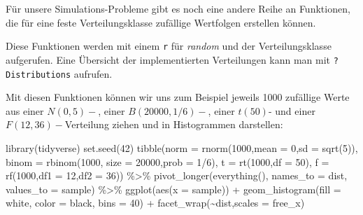 \documentclass[
]{book}
\newenvironment{Shaded}{\begin{snugshade}}{\end{snugshade}}
\newcommand{\AttributeTok}[1]{\textcolor[rgb]{0.77,0.63,0.00}{#1}}
\newcommand{\DecValTok}[1]{\textcolor[rgb]{0.00,0.00,0.81}{#1}}
\newcommand{\FunctionTok}[1]{\textcolor[rgb]{0.00,0.00,0.00}{#1}}
\newcommand{\NormalTok}[1]{#1}
\newcommand{\SpecialCharTok}[1]{\textcolor[rgb]{0.00,0.00,0.00}{#1}}
\newcommand{\StringTok}[1]{\textcolor[rgb]{0.31,0.60,0.02}{#1}}
\begin{document}
Für unsere Simulations-Probleme gibt es noch eine andere Reihe an Funktionen, die für eine feste Verteilungsklasse zufällige Wertfolgen erstellen können.

Diese Funktionen werden mit einem \texttt{r} für \emph{random} und der Verteilungsklasse aufgerufen. Eine Übersicht der implementierten Verteilungen kann man mit \texttt{?Distributions} aufrufen.

Mit diesen Funktionen können wir uns zum Beispiel jeweils 1000 zufällige Werte aus einer \(N(0,5)-\), einer \(B(20000, 1/6)-\), einer \(t(50)\)- und einer \(F(12,36)-\)Verteilung ziehen und in Histogrammen darstellen:

\begin{Shaded}
\begin{Highlighting}[]
\FunctionTok{library}\NormalTok{(tidyverse)}
\FunctionTok{set.seed}\NormalTok{(}\DecValTok{42}\NormalTok{)}
\FunctionTok{tibble}\NormalTok{(}\AttributeTok{norm =} \FunctionTok{rnorm}\NormalTok{(}\DecValTok{1000}\NormalTok{,}\AttributeTok{mean =} \DecValTok{0}\NormalTok{,}\AttributeTok{sd =} \FunctionTok{sqrt}\NormalTok{(}\DecValTok{5}\NormalTok{)),}
       \AttributeTok{binom =} \FunctionTok{rbinom}\NormalTok{(}\DecValTok{1000}\NormalTok{, }\AttributeTok{size =} \DecValTok{20000}\NormalTok{,}\AttributeTok{prob =} \DecValTok{1}\SpecialCharTok{/}\DecValTok{6}\NormalTok{),}
       \AttributeTok{t =} \FunctionTok{rt}\NormalTok{(}\DecValTok{1000}\NormalTok{,}\AttributeTok{df =} \DecValTok{50}\NormalTok{),}
       \AttributeTok{f =} \FunctionTok{rf}\NormalTok{(}\DecValTok{1000}\NormalTok{,}\AttributeTok{df1 =} \DecValTok{12}\NormalTok{,}\AttributeTok{df2 =} \DecValTok{36}\NormalTok{)) }\SpecialCharTok{\%\textgreater{}\%} 
  \FunctionTok{pivot\_longer}\NormalTok{(}\FunctionTok{everything}\NormalTok{(),}
               \AttributeTok{names\_to =} \StringTok{\textquotesingle{}dist\textquotesingle{}}\NormalTok{,}
               \AttributeTok{values\_to =} \StringTok{\textquotesingle{}sample\textquotesingle{}}\NormalTok{) }\SpecialCharTok{\%\textgreater{}\%} 
  \FunctionTok{ggplot}\NormalTok{(}\FunctionTok{aes}\NormalTok{(}\AttributeTok{x =}\NormalTok{ sample)) }\SpecialCharTok{+}
  \FunctionTok{geom\_histogram}\NormalTok{(}\AttributeTok{fill =} \StringTok{\textquotesingle{}white\textquotesingle{}}\NormalTok{,}
                 \AttributeTok{color =} \StringTok{\textquotesingle{}black\textquotesingle{}}\NormalTok{,}
                 \AttributeTok{bins =} \DecValTok{40}\NormalTok{) }\SpecialCharTok{+}
  \FunctionTok{facet\_wrap}\NormalTok{(}\SpecialCharTok{\textasciitilde{}}\NormalTok{dist,}\AttributeTok{scales =} \StringTok{\textquotesingle{}free\_x\textquotesingle{}}\NormalTok{)}
\end{Highlighting}
\end{Shaded}
\end{document}
